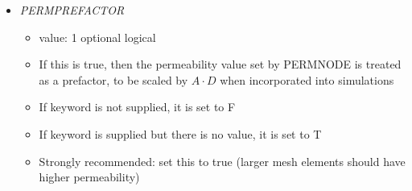 \documentclass[12pt]{article}
\newcommand{\comment}[1]{{\color{red} \it [#1]}}
\begin{document}
\begin{itemize}
\item {\it PERMPREFACTOR}
\begin{itemize}
	\item  value: 1 optional logical
	\item If this is true, then the permeability value set by PERMNODE is treated as a prefactor, to be scaled by $A\cdot D$ when incorporated into simulations
	\item If keyword is not supplied, it is set to F 
	\item If keyword is supplied but there is no value, it is set to T
	\item {\color{red} Strongly recommended: set this to true} (larger mesh elements should have higher permeability)
\end{itemize}
%

\end{itemize}
\end{document}
